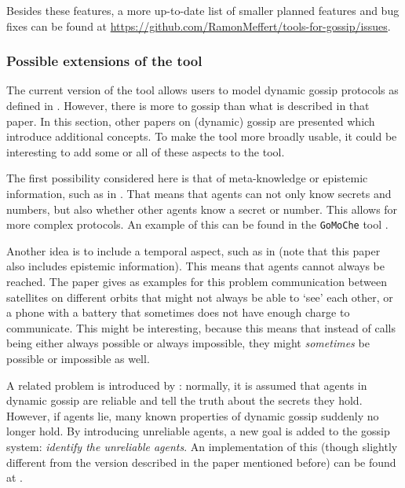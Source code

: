 Besides these features, a more up-to-date list of smaller planned features and bug fixes can be found at \url{https://github.com/RamonMeffert/tools-for-gossip/issues}.

\subsubsection{Possible extensions of the tool}
\label{sec:extensions}

The current version of the tool allows users to model dynamic gossip protocols as defined in \textcite{van_ditmarsch_dynamic_2018}.
However, there is more to gossip than what is described in that paper.
In this section, other papers on (dynamic) gossip are presented which introduce additional concepts.
To make the tool more broadly usable, it could be interesting to add some or all of these aspects to the tool.

The first possibility considered here is that of meta-knowledge or epistemic information, such as in \textcite{herzig_how_2017}.
That means that agents can not only know secrets and numbers, 
but also whether other agents know a secret or number.
This allows for more complex protocols.
An example of this can be found in the \texttt{GoMoChe} tool \parencite{gattinger_m4lvingomoche_2020}.

Another idea is to include a temporal aspect, such as in \textcite{slavkovik_temporal_2019}
(note that this paper also includes epistemic information).
This means that agents cannot always be reached.
The paper gives as examples for this problem communication between satellites on different orbits that might not always be able to `see' each other,
or a phone with a battery that sometimes does not have enough charge to communicate.
This might be interesting, because this means that instead of calls being either always possible or always impossible, 
they might \textit{sometimes} be possible or impossible as well.

A related problem is introduced by \textcite{martins_dealing_2020}: 
normally, it is assumed that agents in dynamic gossip are reliable and tell the truth about the secrets they hold.
However, if agents lie, many known properties of dynamic gossip suddenly no longer hold.
By introducing unreliable agents, a new goal is added to the gossip system:
\textit{identify the unreliable agents}.
An implementation of this (though slightly different from the version described in the paper mentioned before) can be found at \textcite{van_den_berg_unreliable_2020}.

